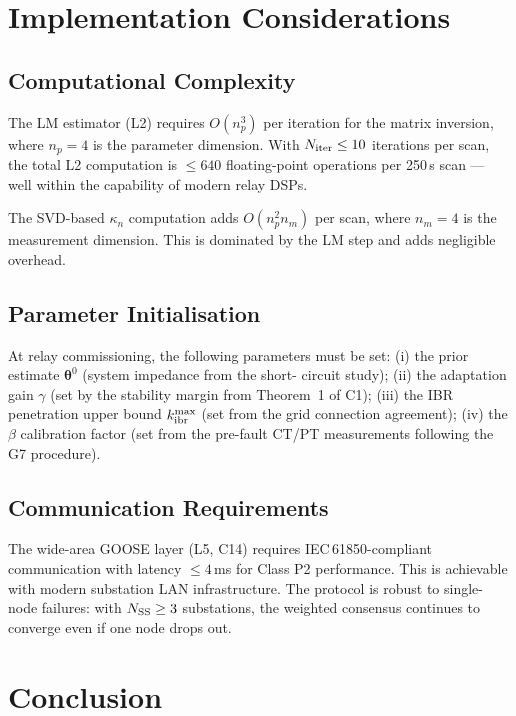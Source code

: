 \documentclass[journal,twoside,10pt]{IEEEtran}
\newcommand{\kappan}{\kappa_{n}}
\newcommand{\kibr}{k_{\rm ibr}}
\newcommand{\bftheta}{\bm{\theta}}
\begin{document}
\section{Implementation Considerations}
\label{sec:implementation}

\subsection{Computational Complexity}

The LM estimator (L2) requires $O(n_p^3)$ per iteration for the
matrix inversion, where $n_p = 4$ is the parameter dimension.  With
$N_{\rm iter} \leq 10$ iterations per scan, the total L2 computation
is $\leq 640$ floating-point operations per 250\,\textmu s scan ---
well within the capability of modern relay DSPs.

The SVD-based $\kappan$ computation adds $O(n_p^2 n_m)$ per scan,
where $n_m = 4$ is the measurement dimension.  This is dominated by
the LM step and adds negligible overhead.

\subsection{Parameter Initialisation}

At relay commissioning, the following parameters must be set:
(i) the prior estimate $\bftheta^0$ (system impedance from the short-
circuit study); (ii) the adaptation gain $\gamma$ (set by the
stability margin from Theorem~1 of C1); (iii) the IBR penetration
upper bound $\kibr^{\max}$ (set from the grid connection agreement);
(iv) the $\beta$ calibration factor (set from the pre-fault CT/PT
measurements following the G7 procedure).

\subsection{Communication Requirements}

The wide-area GOOSE layer (L5, C14) requires IEC\,61850-compliant
communication with latency $\leq 4$\,ms for Class P2 performance.
This is achievable with modern substation LAN infrastructure.  The
protocol is robust to single-node failures: with $N_{\rm SS} \geq 3$
substations, the weighted consensus continues to converge even if one
node drops out.

\section{Conclusion}
\label{sec:conclusion}
\end{document}
